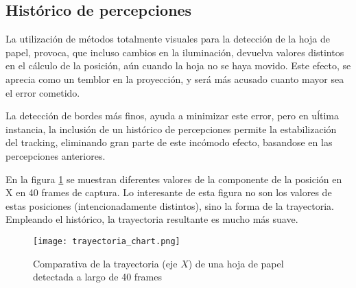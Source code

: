 


\subsection{Histórico de percepciones}
La utilización de métodos totalmente visuales para la detección de la hoja de papel, provoca, que incluso cambios en la iluminación, devuelva valores distintos en el cálculo de la posición, aún cuando la hoja no se haya movido. Este efecto, se aprecia como un temblor en la proyección, y será más acusado cuanto mayor sea el error cometido.

La detección de bordes más finos, ayuda a minimizar este error, pero en uĺtima instancia, la inclusión de un histórico de percepciones permite la estabilización del tracking, eliminando gran parte de este incómodo efecto, basandose en las percepciones anteriores.

En la figura \ref{fig:historic_chart} se muestran diferentes valores de la componente de la posición en X en 40 frames de captura. Lo interesante de esta figura no son los valores de estas posiciones (intencionadamente distintos), sino la forma de la trayectoria. Empleando el histórico, la trayectoria resultante es mucho más suave.

\begin{figure}
  \begin{center}
    \texttt{[image: trayectoria\_chart.png]}
    \caption{Comparativa de la trayectoria (eje $X$) de una hoja de papel detectada a largo de 40 frames}
    \label{fig:historic_chart}
  \end{center}
\end{figure}

